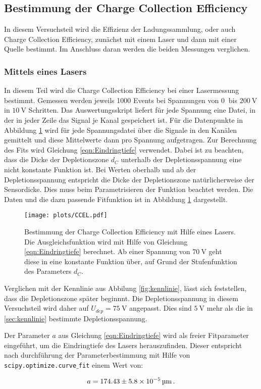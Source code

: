 \subsection{Bestimmung der Charge Collection Efficiency}
\label{sec:CCE}
In diesem Versuchsteil wird die Effizienz der Ladungssammlung, oder auch
Charge Collection Efficiency, zunächst mit einem Laser und dann mit
einer Quelle bestimmt. Im Anschluss daran werden die beiden Messungen
verglichen.

\subsubsection{Mittels eines Lasers}
\label{sec:CCEL}

In diesem Teil wird die Charge Collection Efficiency bei einer
Lasermessung bestimmt. Gemessen werden jeweils 1000 Events
bei Spannungen von $\SI{0}{}$ bis $\SI{200}{\volt}$ in
$\SI{10}{\volt}$ Schritten. Das Auswertungsskript liefert für jede
Spannung eine Datei, in der in jeder Zeile das Signal je
Kanal gespeichert ist. Für die Datenpunkte in Abbildung
\ref{fig:CCEL} wird für jede Spannungsdatei über die Signale in
den Kanälen gemittelt und diese Mittelwerte dann pro Spannung
aufgetragen. Zur Berechnung des Fits wird Gleichung
\eqref{eqn:Eindringtiefe} verwendet. Dabei ist zu beachten, dass
die Dicke der Depletionszone $d_C$ unterhalb der Depletionsspannung
eine nicht konstante Funktion ist. Bei Werten oberhalb und ab der
Depletionsspannung entspricht die Dicke der Depletionszone natürlicherweise
der Sensordicke. Dies muss beim Parametrisieren der Funktion
beachtet werden. Die Daten und die dazu passende Fitfunktion ist in
Abbildung \ref{fig:CCEL} dargestellt.

\begin{figure}[H]
  \centering
  \texttt{[image: plots/CCEL.pdf]}
  \caption{Bestimmung der Charge Collection Efficiency mit Hilfe eines
  Lasers. Die Ausgleichsfunktion wird mit Hilfe von Gleichung
  \eqref{eqn:Eindringtiefe} berechnet. Ab einer Spannung von $\SI{70}{\volt}$ geht
  diese in eine konstante Funktion über, auf Grund der Stufenfunktion des
  Parameters $d_C$.}
  \label{fig:CCEL}
\end{figure}

Verglichen mit der Kennlinie aus Abbilung \ref{fig:kennlinie}, lässt sich
feststellen, dass die Depletionszone später beginnnt. Die Depletionsspannung
in diesem Versuchsteil wird daher auf $U_{dep} = \SI{75}{\volt}$ angepasst. Dies
sind $\SI{5}{\volt}$ mehr als die in \ref{sec:kennlinie} bestimmte
Depletionsspannung. \par

Der Parameter $a$ aus Gleichung \eqref{eqn:Eindringtiefe} wird als freier
Fitparameter eingeführt, um die Eindringtiefe des Lasers herauszufinden.
Dieser entspricht nach durchführung der Parameterbestimmung mit Hilfe
von \texttt{scipy.optimize.curve$\_$fit} einem Wert von:

\begin{align*}
    a = \SI[parse-numbers=false]{174.43 \pm 5.8 \times 10^{-5}}{\micro\meter} \, .
\end{align*}
